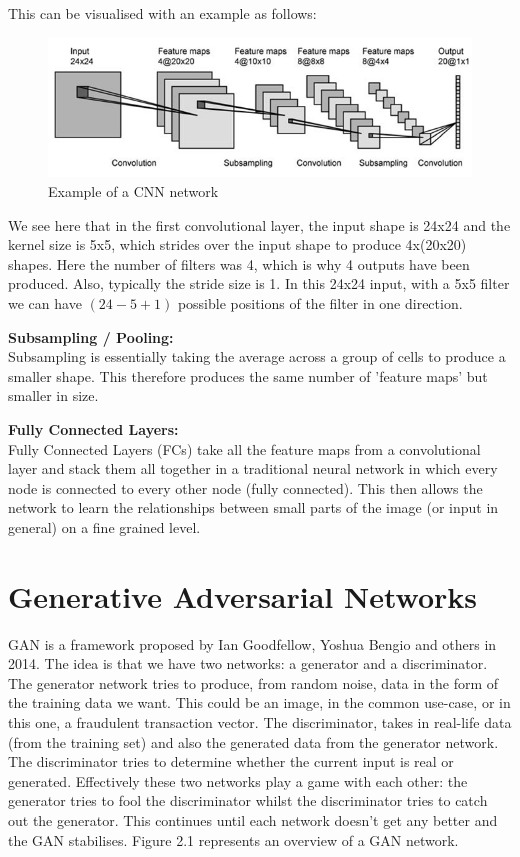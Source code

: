 \documentclass[12pt,a4paper,twoside]{report}
\begin{document}
This can be visualised with an example as follows:\\

\begin{figure}[H]

\centering
\includegraphics[width=\textwidth]{CNN-Example}
\caption{Example of a CNN network}
\end{figure}

We see here that in the first convolutional layer, the input shape is 24x24 and the kernel size is 5x5, which strides over the input shape to produce 4x(20x20) shapes. Here the number of filters was 4, which is why 4 outputs have been produced. Also, typically the stride size is 1. In this 24x24 input, with a 5x5 filter we can have $(24-5+1)$ possible positions of the filter in one direction. 

\textbf{Subsampling / Pooling:}\\
Subsampling is essentially taking the average across a group of cells to produce a smaller shape. This therefore produces the same number of 'feature maps' but smaller in size. 

\textbf{Fully Connected Layers:}\\
Fully Connected Layers (FCs) take all the feature maps from a convolutional layer and stack them all together in a traditional neural network in which every node is connected to every other node (fully connected). This then allows the network to learn the relationships between small parts of the image (or input in general) on a fine grained level. 


\section{Generative Adversarial Networks}
GAN is a framework proposed by Ian Goodfellow, Yoshua Bengio and others in 2014. The idea is that we have two networks: a generator and a discriminator. The generator network tries to produce,  from random noise,  data in the form of the training data we want. This could be an image, in the common use-case, or in this one, a fraudulent transaction vector. The discriminator, takes in real-life data (from the training set) and also the generated data from the generator network. The discriminator tries to determine whether the current input is real or generated. Effectively these two networks play a game with each other: the generator tries to fool the discriminator whilst the discriminator tries to catch out the generator. This continues until each network doesn't get any better and the GAN stabilises. Figure 2.1 represents an overview of a GAN network.
\end{document}
